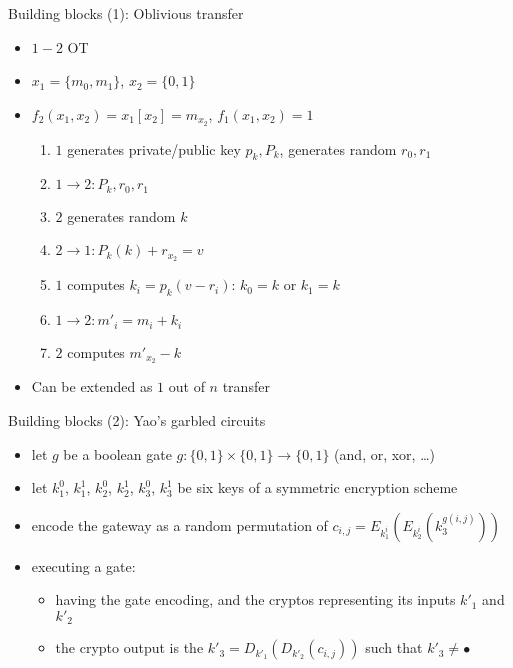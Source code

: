 \documentclass{beamer}
\begin{document}
\begin{frame}{Building blocks (1): Oblivious transfer}
  \begin{itemize}
    \item $1-2$ OT
    \item $x_1 = \{m_0, m_1\}$, $x_2 = \{0, 1\}$
    \item $f_2(x_1, x_2) = x_1[x_2] = m_{x_2}$, $f_1(x_1, x_2) = 1$
      
      \begin{enumerate}
        \item $1$ generates private/public key $p_k, P_k$, generates random $r_0, r_1$
        \item $1 \rightarrow 2: P_k,r_0,r_1$
        \item $2$ generates random $k$
        \item $2 \rightarrow 1: P_k(k) + r_{x_2} = v$
        \item $1$ computes $k_i = p_k(v-r_i)$: $k_0=k$ or $k_1=k$
        \item $1 \rightarrow 2: m'_i = m_i+k_i$
        \item $2$ computes $m'_{x_2} - k$
      \end{enumerate}
    \item Can be extended as $1$ out of $n$ transfer
  \end{itemize}
\end{frame}


\begin{frame}{Building blocks (2): Yao's garbled circuits}
  
  \begin{itemize}
  \item let $g$ be a boolean gate $g:\{0,1\} \times \{0,1\}
    \rightarrow \{0,1\}$ (and, or, xor, \dots)
  \item let $k^0_1$, $k^1_1$, $k^0_2$, $k^1_2$, $k^0_3$, $k^1_3$ be
    six keys of a symmetric encryption scheme
  \item encode the gateway as a random permutation of
    $c_{i,j} = E_{k^i_1}(E_{k^i_2}(k^{g(i,j)}_3))$
  \item executing a gate:
    
    \begin{itemize}
    \item having the gate encoding, and the cryptos representing its
      inputs $k'_1$ and $k'_2$
    \item the crypto output is the $k'_3=D_{k'_1}(D_{k'_2}(c_{i,j}))$
      such that $k'_3 \neq \bullet$
    \end{itemize}
  \end{itemize}
\end{frame}
\end{document}
